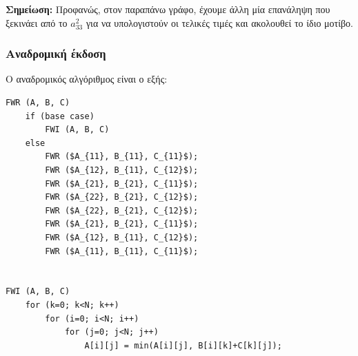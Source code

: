 \documentclass{article}
\begin{document}
\begin{enumerate}
\begin{center}
\end{center}

\textbf{Σημείωση:} Προφανώς, στον παραπάνω γράφο, έχουμε άλλη μία επανάληψη που ξεκινάει από το $a_{33}^{2}$ για να υπολογιστούν οι τελικές τιμές και ακολουθεί το ίδιο μοτίβο.

\end{enumerate}


\subsubsection{Αναδρομική έκδοση}
Ο αναδρομικός αλγόριθμος είναι ο εξής:

\begin{lstlisting}[style=CStyle, mathescape]
FWR (A, B, C)
	if (base case)
		FWI (A, B, C)
	else
		FWR ($A_{11}, B_{11}, C_{11}$);
		FWR ($A_{12}, B_{11}, C_{12}$);
		FWR ($A_{21}, B_{21}, C_{11}$);
		FWR ($A_{22}, B_{21}, C_{12}$);
		FWR ($A_{22}, B_{21}, C_{12}$);
		FWR ($A_{21}, B_{21}, C_{11}$);
		FWR ($A_{12}, B_{11}, C_{12}$);
		FWR ($A_{11}, B_{11}, C_{11}$);


FWI (A, B, C)
	for (k=0; k<N; k++)
		for (i=0; i<N; i++)
			for (j=0; j<N; j++)
				A[i][j] = min(A[i][j], B[i][k]+C[k][j]); 
\end{lstlisting}
\end{document}

